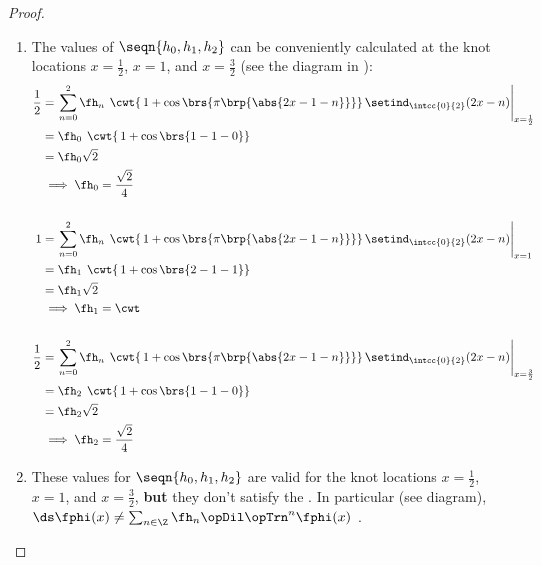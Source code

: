 \begin{proof}
\begin{enumerate}
\begin{enumerate}
      \item The values of $\seqn{h_0,h_1,h_2}$ can be conveniently calculated at the knot locations $x=\frac{1}{2}$, $x=1$, and $x=\frac{3}{2}$ (see the diagram in ):
        \begin{align*}
          \frac{1}{2}
            &= \left.\sum_{n=0}^2 \fh_n \left.\left.\cwt \right\{1 + \cos\brs{\pi\brp{\abs{2x-1-n}}}\right\}\setind_\intcc{0}{2}(2x-n)\right|_{x=\frac{1}{2}}
          \\&=\fh_0 \left.\left.\cwt \right\{1 + \cos\brs{1-1-0}\right\}
          \\&=\fh_0 \sqrt{2}
          \\&\implies\fh_0 = \frac{\sqrt{2}}{4}
          \\
          \\
          1
            &= \left.\sum_{n=0}^2 \fh_n \left.\left.\cwt \right\{1 + \cos\brs{\pi\brp{\abs{2x-1-n}}}\right\}\setind_\intcc{0}{2}(2x-n)\right|_{x=1}
          \\&=\fh_1 \left.\left.\cwt \right\{1 + \cos\brs{2-1-1}\right\}
          \\&=\fh_1 \sqrt{2}
          \\&\implies\fh_1 = \cwt 
          \\
          \\
          \frac{1}{2}
            &= \left.\sum_{n=0}^2 \fh_n \left.\left.\cwt \right\{1 + \cos\brs{\pi\brp{\abs{2x-1-n}}}\right\}\setind_\intcc{0}{2}(2x-n)\right|_{x=\frac{3}{2}}
          \\&=\fh_2 \left.\left.\cwt \right\{1 + \cos\brs{1-1-0}\right\}
          \\&=\fh_2 \sqrt{2}
          \\&\implies\fh_2 = \frac{\sqrt{2}}{4}
        \end{align*}

      \item These values for $\seqn{h_0,h_1,h_2}$ are valid for the knot locations $x=\frac{1}{2}$, $x=1$, and $x=\frac{3}{2}$, 
            \textbf{but} they don't satisfy the  . In particular (see diagram),
            \\\indentx$\ds\fphi(x) \neq \sum_{n\in\Z}\fh_n \opDil\opTrn^n \fphi(x)$ .
    \end{enumerate}
\end{enumerate}
\end{proof}

